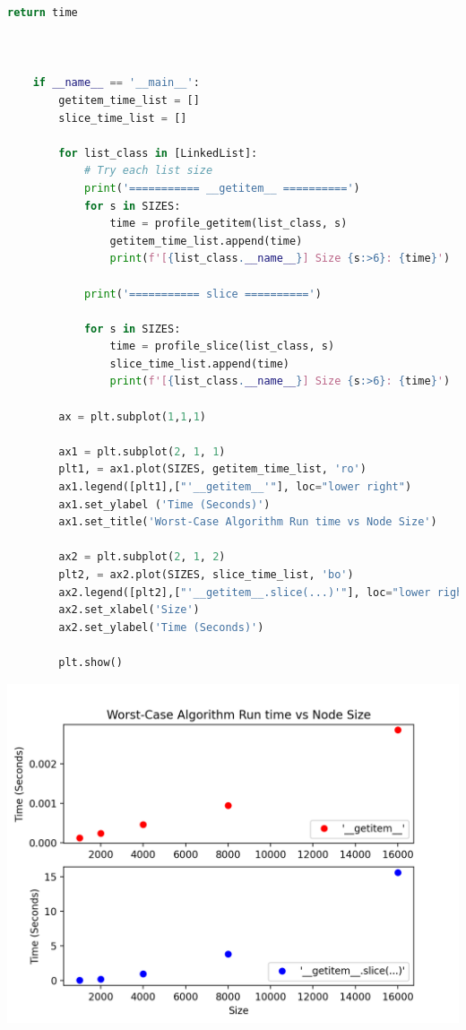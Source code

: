 \documentclass[12pt]{article}
\begin{document}
\begin{mdframed}
\begin{lstlisting}[language=python,caption={task\_4\_part\_2\_solution.py}]
        return time



    if __name__ == '__main__':
        getitem_time_list = []
        slice_time_list = []

        for list_class in [LinkedList]:
            # Try each list size
            print('=========== __getitem__ ==========')
            for s in SIZES:
                time = profile_getitem(list_class, s)
                getitem_time_list.append(time)
                print(f'[{list_class.__name__}] Size {s:>6}: {time}')

            print('=========== slice ==========')

            for s in SIZES:
                time = profile_slice(list_class, s)
                slice_time_list.append(time)
                print(f'[{list_class.__name__}] Size {s:>6}: {time}')

        ax = plt.subplot(1,1,1)

        ax1 = plt.subplot(2, 1, 1)
        plt1, = ax1.plot(SIZES, getitem_time_list, 'ro')
        ax1.legend([plt1],["'__getitem__'"], loc="lower right")
        ax1.set_ylabel ('Time (Seconds)')
        ax1.set_title('Worst-Case Algorithm Run time vs Node Size')

        ax2 = plt.subplot(2, 1, 2)
        plt2, = ax2.plot(SIZES, slice_time_list, 'bo')
        ax2.legend([plt2],["'__getitem__.slice(...)'"], loc="lower right")
        ax2.set_xlabel('Size')
        ax2.set_ylabel('Time (Seconds)')

        plt.show()
    \end{lstlisting}

    \bigskip

    \begin{center}
    \includegraphics[width=0.8 \linewidth]{../../images/lab5_t4_s2_solution.png}
    \end{center}
\end{mdframed}
\end{document}
